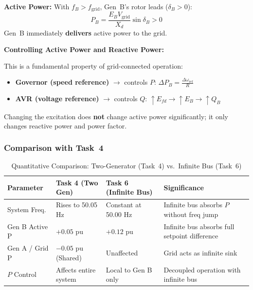 \documentclass[12pt, a4paper]{article}
\begin{document}
\textbf{Active Power:}
With $f_B > f_{\text{grid}}$, Gen~B's rotor leads ($\delta_B > 0$):
\begin{equation}
    P_B = \frac{E_B V_{\text{grid}}}{X_d} \sin\delta_B > 0
\end{equation}
Gen~B immediately \textbf{delivers} active power to the grid.

\textbf{Controlling Active Power and Reactive Power:}

This is a fundamental property of grid-connected operation:
\begin{itemize}[noitemsep]
    \item \textbf{Governor (speed reference)} $\rightarrow$ controls $P$: \quad $\Delta P_B = \frac{\Delta \omega_{\text{ref}}}{R}$
    \item \textbf{AVR (voltage reference)} $\rightarrow$ controls $Q$: \quad $\uparrow E_{fd} \rightarrow \uparrow E_B \rightarrow \uparrow Q_B$
\end{itemize}

Changing the excitation does \textbf{not} change active power significantly; it only changes reactive power and power factor.

\subsubsection{Comparison with Task~4}

\begin{table}[H]
    \centering
    \caption{Quantitative Comparison: Two-Generator (Task~4) vs.\ Infinite Bus (Task~6)}
    \begin{tabular}{lllp{4cm}}
        \toprule
        \textbf{Parameter} & \textbf{Task 4 (Two Gen)} & \textbf{Task 6 (Infinite Bus)} & \textbf{Significance} \\
        \midrule
        System Freq. & Rises to 50.05 Hz & Constant at 50.00 Hz & Infinite bus absorbs $P$ without freq jump \\
        Gen B Active P & $+0.05$ pu & $+0.12$ pu & Infinite bus absorbs full setpoint difference \\
        Gen A / Grid P & $-0.05$ pu (Shared) & Unaffected & Grid acts as infinite sink \\
        $P$ Control & Affects entire system & Local to Gen B only & Decoupled operation with infinite bus \\
        \bottomrule
    \end{tabular}
    \label{tab:task46_comparison}
\end{table}
\end{document}
